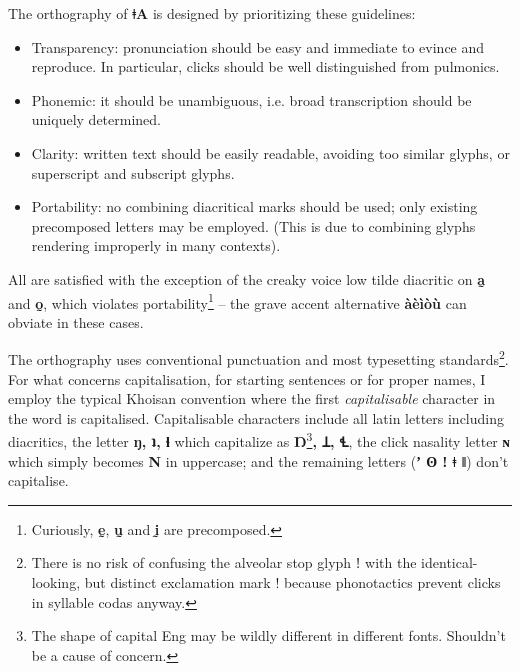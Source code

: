 \documentclass[11pt,a5paper]{book}
\newcommand{\qcn}[1]{\textcolor{AccentText}{\large\textbf{#1}}}
\newcommand{\langname}{\qcn{ǂA}}
\begin{document}
The orthography of \langname{} is designed by prioritizing these guidelines:

\begin{itemize}
	\item Transparency: pronunciation should be easy and immediate to evince and reproduce. In particular, clicks should be well distinguished from pulmonics.
	\item Phonemic: it should be unambiguous, i.e. broad transcrip\-tion should be uniquely determined.
	\item Clarity: written text should be easily readable, avoiding too similar glyphs, or superscript and subscript glyphs.
	\item Portability: no combining diacritical marks should be used; only existing precomposed letters may be employed. (This is due to combining glyphs rendering improperly in many contexts). 
\end{itemize}

All are satisfied with the exception of the creaky voice low tilde diacritic on \qcn{a̰} and \qcn{o̰}, which violates portability\footnote{Curiously, \qcn{ḛ}, \qcn{ṵ} and \qcn{ḭ} are precomposed.} -- the grave accent alternative \qcn{àèìòù} can obviate in these cases.

The orthography uses conventional punctuation and most typesetting standards\footnote{There is no risk of confusing the alveolar stop glyph ǃ with the identical-looking, but distinct exclamation mark ! because phonotactics prevent clicks in syllable codas anyway.}. For what concerns capitalisation, for starting sentences or for proper names, I employ the typical Khoisan convention where the first \emph{capitalisable} character in the word is capitalised. Capitalisable characters include all latin letters including diacritics, the letter \qcn{ŋ, ʇ, ɬ} which capitalize as \qcn{Ŋ}\footnote{The shape of capital Eng may be wildly different in different fonts. Shouldn't be a cause of concern.}\qcn{, Ʇ, Ɬ}, the click nasality letter \qcn{ɴ} which simply becomes \qcn{N} in uppercase; and the remaining letters (\qcn{ʼ ʘ ǃ ǂ ǁ}) don't capitalise. 
\end{document}
